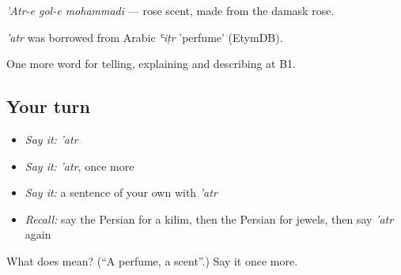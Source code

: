 \emph{'Atr-e gol-e mohammadi} — rose scent, made from the damask rose.

\begin{cousinweb}
\emph{'atr} was borrowed from Arabic \emph{ʿiṭr} 'perfume' (EtymDB).
\end{cousinweb}

\begin{grammarlens}[title={What you've built}]
One more word for telling, explaining and describing at B1.
\end{grammarlens}

\subsection*{Your turn}
\begin{itemize}
\raggedright
  \item \emph{Say it:} \emph{'atr}
  \item \emph{Say it:} \emph{'atr}, once more
  \item \emph{Say it:} a sentence of your own with \emph{'atr}
  \item \emph{Recall:} say the Persian for a kilim, then the Persian for jewels, then say \emph{'atr} again
\end{itemize}

\begin{tcolorbox}[breakable,colback=teal!4,colframe=teal!35!black,title={Before you move on}]
What does  mean? (\textquotedblleft{}A perfume, a scent\textquotedblright{}.) Say it once more.
\end{tcolorbox}
